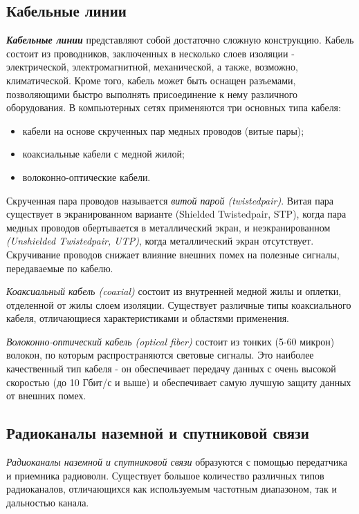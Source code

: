 \subsection{Кабельные линии}

\textbf{\textit{Кабельные линии}} представляют собой достаточно сложную конструкцию.
Кабель состоит из проводников, заключенных в несколько слоев изоляции - электрической, электромагнитной, механической, а также, возможно, климатической.
Кроме того, кабель может быть оснащен разъемами, позволяющими быстро выполнять присоединение к нему различного оборудования.
В компьютерных сетях применяются три основных типа кабеля:
\begin{itemize}
    \item кабели на основе скрученных пар медных проводов (витые пары);
    \item коаксиальные кабели с медной жилой;
    \item волоконно-оптические кабели.
\end{itemize}

Скрученная пара проводов называется \emph{витой парой (twistedpair)}.
Витая пара существует в экранированном варианте (Shielded Twistedpair, STP), когда пара медных проводов обертывается в металлический экран, и неэкранированном \emph{(Unshielded Twistedpair, UTP)}, когда металлический экран отсутствует.
Скручивание проводов снижает влияние внешних помех на полезные сигналы, передаваемые по кабелю.

\emph{Коаксиальный кабель (coaxial)} состоит из внутренней медной жилы и оплетки, отделенной от жилы слоем изоляции.
Существует различные типы коаксиального кабеля, отличающиеся характеристиками и областями применения.

\emph{Волоконно-оптический кабель (optical fiber)} состоит из тонких (5-60 микрон) волокон, по которым распространяются световые сигналы.
Это наиболее качественный тип кабеля - он обеспечивает передачу данных с очень высокой скоростью (до 10 Гбит/с и выше) и обеспечивает самую лучшую защиту данных от внешних помех.

\subsection{Радиоканалы наземной и спутниковой связи}

\emph{Радиоканалы наземной и спутниковой связи} образуются с помощью передатчика и приемника радиоволн.
Существует большое количество различных типов радиоканалов, отличающихся как используемым частотным диапазоном, так и дальностью канала.

